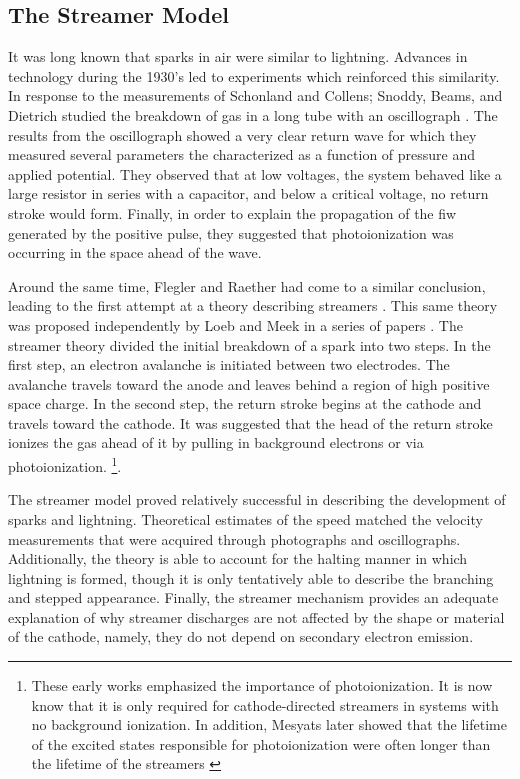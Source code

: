 \subsection{The Streamer Model}

It was long known that sparks in air were similar to lightning. Advances in
technology during the 1930's led to experiments which reinforced this
similarity. In response to the measurements of Schonland and Collens; Snoddy,
Beams, and Dietrich studied the breakdown of gas in a long tube with an
oscillograph \cite{Snoddy1936}. The results from the oscillograph showed a very
clear return wave for which they measured several parameters the characterized
as a function of pressure and applied potential. They observed that at low
voltages, the system behaved like a large resistor in series with a capacitor,
and below a critical voltage, no return stroke would form. Finally, in order to
explain the propagation of the \acs{fiw} generated by the positive pulse, they
suggested that photoionization was occurring in the space ahead of the wave.

Around the same time, Flegler and Raether had come to a similar conclusion,
leading to the first attempt at a theory describing streamers
\cite{Flegler1936}. This same theory was proposed independently by Loeb and Meek
in a series of papers \cite{Loeb1940, Loeb1940a, Meek1940}. The streamer theory
divided the initial breakdown of a spark into two steps. In the first step, an
electron avalanche is initiated between two electrodes. The avalanche travels
toward the anode and leaves behind a region of high positive space charge. In
the second step, the return stroke begins at the cathode and travels toward the
cathode. It was suggested that the head of the return stroke ionizes the gas
ahead of it by pulling in background electrons or via photoionization.
\footnote{These early works emphasized the importance of photoionization. It is
now know that it is only required for cathode-directed streamers in systems with
no background ionization. In addition, Mesyats later showed that the lifetime of
the excited states responsible for photoionization were often longer than the
lifetime of the streamers \cite{Mesyats1972}}.

The streamer model proved relatively successful in describing the development of
sparks and lightning. Theoretical estimates of the speed matched the velocity
measurements that were acquired through photographs and oscillographs.
Additionally, the theory is able to account for the halting manner in which
lightning is formed, though it is only tentatively able to describe the
branching and stepped appearance. Finally, the streamer mechanism provides an
adequate explanation of why streamer discharges are not affected by the shape or
material of the cathode, namely, they do not depend on secondary electron
emission.

